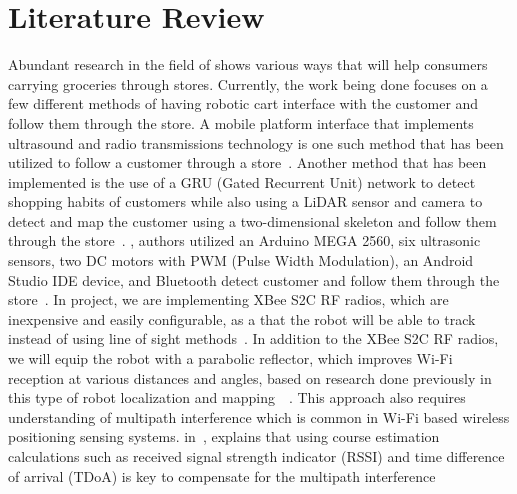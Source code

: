 \documentclass[letterpaper,12pt]{article}   %
\begin{document}
\section{Literature Review}
Abundant research in the field of  shows
various ways  that will help consumers 
carrying groceries through stores. 
Currently, the work being done focuses on a few different methods of having
robotic cart interface with the customer and follow them through the store. A
mobile platform interface that implements ultrasound and radio transmissions
technology is one such method that has been utilized to follow a customer
through a store~\cite{Sales2016-CompaRob}. Another method that has been
implemented is the use of a GRU (Gated Recurrent Unit) network to detect
shopping habits of customers while also using a LiDAR sensor and camera to
detect and map the customer using a two-dimensional skeleton and follow them
through the store~\cite{islam_lam_fukuda_kobayashi_kuno_2019}. , authors utilized an Arduino MEGA 2560, six ultrasonic sensors, two
DC motors with PWM (Pulse Width Modulation), an Android Studio IDE device, and
Bluetooth  detect  customer and follow them through the
store~\cite{Rawashdeh2017-Person}. In  project, we are implementing XBee S2C
RF radios, which are inexpensive and easily configurable, as a
 that the
robot will be able to track instead of using line of sight
methods~\cite{Miah2018-Intelligent}. In addition to the XBee S2C RF radios, we
will equip the robot with a parabolic reflector, which improves Wi-Fi reception
at various distances and angles, based on research done previously in this type
of robot localization and mapping~\cite{Miah2018-Intelligent}~\cite{Li2013ANA}.
This approach also requires understanding of multipath interference which is
common in Wi-Fi based wireless positioning sensing systems.  
in~\cite{xie_jiang_zhao_zhang_2019}, explains that using course estimation
calculations such as received signal strength indicator (RSSI) and time
difference of arrival (TDoA) is key to compensate for the multipath interference
\end{document}
